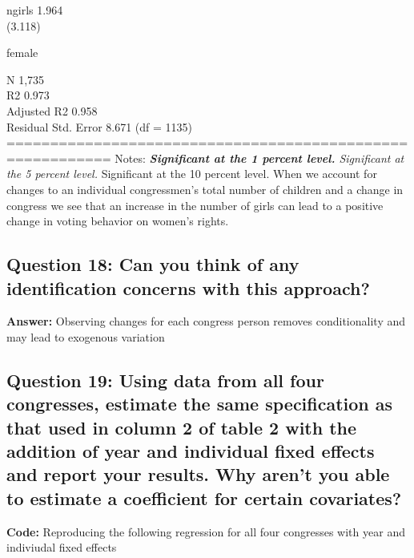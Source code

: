 \documentclass[
]{article}
\begin{document}
ngirls 1.964\\
(3.118)

female

N 1,735\\
R2 0.973\\
Adjusted R2 0.958\\
Residual Std. Error 8.671 (df = 1135)\\
========================================================== Notes:
\emph{\textbf{Significant at the 1 percent level. }Significant at the 5
percent level. }Significant at the 10 percent level. When we account for
changes to an individual congressmen's total number of children and a
change in congress we see that an increase in the number of girls can
lead to a positive change in voting behavior on women's rights.

\hypertarget{question-18-can-you-think-of-any-identification-concerns-with-this-approach}{%
\subsection{Question 18: Can you think of any identification concerns
with this
approach?}\label{question-18-can-you-think-of-any-identification-concerns-with-this-approach}}

\textbf{Answer:} Observing changes for each congress person removes
conditionality and may lead to exogenous variation

\hypertarget{question-19-using-data-from-all-four-congresses-estimate-the-same-specification-as-that-used-in-column-2-of-table-2-with-the-addition-of-year-and-individual-fixed-effects-and-report-your-results.-why-arent-you-able-to-estimate-a-coefficient-for-certain-covariates}{%
\subsection{Question 19: Using data from all four congresses, estimate
the same specification as that used in column 2 of table 2 with the
addition of year and individual fixed effects and report your results.
Why aren't you able to estimate a coefficient for certain
covariates?}\label{question-19-using-data-from-all-four-congresses-estimate-the-same-specification-as-that-used-in-column-2-of-table-2-with-the-addition-of-year-and-individual-fixed-effects-and-report-your-results.-why-arent-you-able-to-estimate-a-coefficient-for-certain-covariates}}

\textbf{Code:} Reproducing the following regression for all four
congresses with year and indiviudal fixed effects
\end{document}
